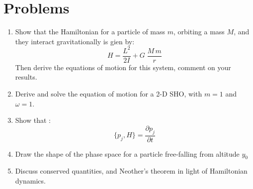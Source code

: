     \section{Problems }
    \begin{enumerate}
\item Show that the Hamiltonian for a particle of mass $m$, orbiting a mass $M$, and they interact gravitationally is gien by:
    \begin{equation*}
    H = \frac{L^2}{2I}+ G \; \frac{M\, m}{r}
    \end{equation*}
    Then derive the equations of motion for this system, comment on your results.
    \item  Derive and solve the equation of motion for a 2-D SHO, with $ m=1$ and $ \omega =1$.
    \item  Show that :
    \begin{equation*}
    \{p_j , H\} = \dfrac{\partial p_j }{\partial t}
    \end{equation*}
 \item  Draw the shape of the phase space for a particle free-falling from altitude $y_0$

\item     Discuss conserved quantities, and Neother's theorem in light of Hamiltonian dynamics.  
    \end{enumerate}